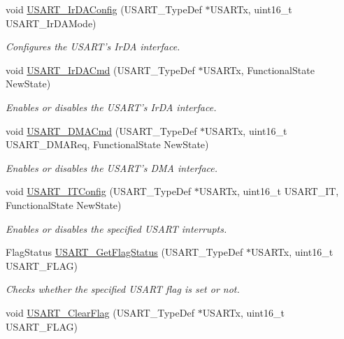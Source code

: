 \begin{DoxyCompactItemize}
void \hyperlink{group___u_s_a_r_t_ga81a0cd36199040bf6d266b57babd678e}{U\-S\-A\-R\-T\-\_\-\-Ir\-D\-A\-Config} (U\-S\-A\-R\-T\-\_\-\-Type\-Def $\ast$U\-S\-A\-R\-Tx, uint16\-\_\-t U\-S\-A\-R\-T\-\_\-\-Ir\-D\-A\-Mode)
\begin{DoxyCompactList}\small\item\em Configures the U\-S\-A\-R\-T's Ir\-D\-A interface. \end{DoxyCompactList}\item 
void \hyperlink{group___u_s_a_r_t_gabff56ebb494fdfadcc6ef4fe9ac8dd24}{U\-S\-A\-R\-T\-\_\-\-Ir\-D\-A\-Cmd} (U\-S\-A\-R\-T\-\_\-\-Type\-Def $\ast$U\-S\-A\-R\-Tx, Functional\-State New\-State)
\begin{DoxyCompactList}\small\item\em Enables or disables the U\-S\-A\-R\-T's Ir\-D\-A interface. \end{DoxyCompactList}\item 
void \hyperlink{group___u_s_a_r_t_ga902857f199ebfba21c63d725354af66f}{U\-S\-A\-R\-T\-\_\-\-D\-M\-A\-Cmd} (U\-S\-A\-R\-T\-\_\-\-Type\-Def $\ast$U\-S\-A\-R\-Tx, uint16\-\_\-t U\-S\-A\-R\-T\-\_\-\-D\-M\-A\-Req, Functional\-State New\-State)
\begin{DoxyCompactList}\small\item\em Enables or disables the U\-S\-A\-R\-T's D\-M\-A interface. \end{DoxyCompactList}\item 
void \hyperlink{group___u_s_a_r_t_ga6d8f2dd1f34060ae7e386e3e5d56b6f6}{U\-S\-A\-R\-T\-\_\-\-I\-T\-Config} (U\-S\-A\-R\-T\-\_\-\-Type\-Def $\ast$U\-S\-A\-R\-Tx, uint16\-\_\-t U\-S\-A\-R\-T\-\_\-\-I\-T, Functional\-State New\-State)
\begin{DoxyCompactList}\small\item\em Enables or disables the specified U\-S\-A\-R\-T interrupts. \end{DoxyCompactList}\item 
Flag\-Status \hyperlink{group___u_s_a_r_t_ga144630722defc9e312f0ad280b68e9da}{U\-S\-A\-R\-T\-\_\-\-Get\-Flag\-Status} (U\-S\-A\-R\-T\-\_\-\-Type\-Def $\ast$U\-S\-A\-R\-Tx, uint16\-\_\-t U\-S\-A\-R\-T\-\_\-\-F\-L\-A\-G)
\begin{DoxyCompactList}\small\item\em Checks whether the specified U\-S\-A\-R\-T flag is set or not. \end{DoxyCompactList}\item 
void \hyperlink{group___u_s_a_r_t_gad962e148fc466ae1b45b288f6c91d966}{U\-S\-A\-R\-T\-\_\-\-Clear\-Flag} (U\-S\-A\-R\-T\-\_\-\-Type\-Def $\ast$U\-S\-A\-R\-Tx, uint16\-\_\-t U\-S\-A\-R\-T\-\_\-\-F\-L\-A\-G)

\end{DoxyCompactItemize}
